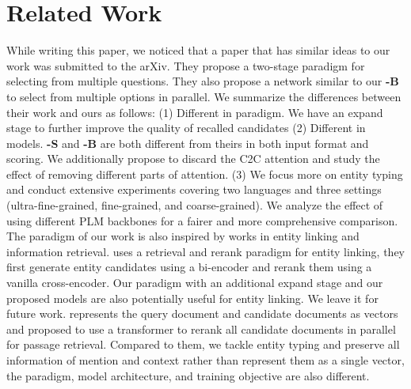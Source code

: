 \section{Related Work}
While writing this paper, we noticed that a paper \cite{Du2022LearningTS} that has similar ideas to our work was submitted to the arXiv. They propose a two-stage paradigm for selecting from multiple questions. They also propose a network similar to our {\bf \textsc{\name-B}} to select from multiple options in parallel. We summarize the differences between their work and ours as follows: (1) Different in paradigm. We have an expand stage to further improve the quality of recalled candidates (2) Different in models. {\bf \textsc{\name-S}} and {\bf \textsc{\name-B}} are both different from theirs in both input format and scoring. We additionally propose to discard the C2C attention and study the effect of removing different parts of attention. (3) We focus more on entity typing and conduct extensive experiments covering two languages and three settings (ultra-fine-grained, fine-grained, and coarse-grained). We analyze the effect of using different PLM backbones for a fairer and more comprehensive comparison.
The paradigm of our work is also inspired by works in entity linking and information retrieval. \citet{wu2019zero} uses a retrieval and rerank paradigm for entity linking, they first generate entity candidates using a bi-encoder and rerank them using a vanilla cross-encoder. Our paradigm with an additional expand stage and our proposed {\bf \textsc{\name}} models are also potentially useful for entity linking. We leave it for future work. \citet{halter} represents the query document and candidate documents as vectors and proposed to use a transformer to rerank all candidate documents in parallel for passage retrieval. Compared to them, we tackle entity typing and preserve all information of mention and context rather than represent them as a single vector, the paradigm, model architecture, and training objective are also different.



